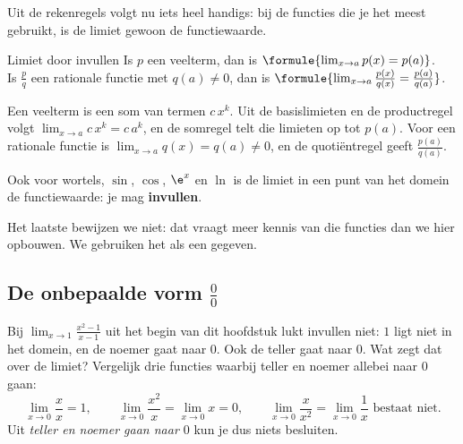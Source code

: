 Uit de rekenregels volgt nu iets heel handigs: bij de functies die je het meest gebruikt, is de limiet gewoon de functiewaarde.

\begin{theorie}
\begin{stelling}{Limiet door invullen}
Is $p$ een veelterm, dan is \quad $\formule{\lim_{x \to a} p(x) = p(a)}$. \\
Is $\frac{p}{q}$ een rationale functie met $q(a) \neq 0$, dan is \quad $\formule{\lim_{x \to a} \frac{p(x)}{q(x)} = \frac{p(a)}{q(a)}}$.
\end{stelling}
\begin{bewijs}
Een veelterm is een som van termen $c\,x^k$. Uit de basislimieten en de productregel volgt $\lim_{x \to a} c\,x^k = c\,a^k$, en de somregel telt die limieten op tot $p(a)$. Voor een rationale functie is $\lim_{x \to a} q(x) = q(a) \neq 0$, en de quotiëntregel geeft $\frac{p(a)}{q(a)}$.
\end{bewijs}
Ook voor wortels, $\sin$, $\cos$, $\e^x$ en $\ln$ is de limiet in een punt van het domein de functiewaarde: je mag \textbf{\textcolor{accent}{invullen}}.
\end{theorie}

Het laatste bewijzen we niet: dat vraagt meer kennis van die functies dan we hier opbouwen. We gebruiken het als een gegeven.


\begin{oefeningen}
\end{oefeningen}

\subsection{De onbepaalde vorm \texorpdfstring{$\frac00$}{0/0}}

Bij $\lim_{x \to 1} \frac{x^2 - 1}{x - 1}$ uit het begin van dit hoofdstuk lukt invullen niet: $1$ ligt niet in het domein, en de noemer gaat naar $0$. Ook de teller gaat naar $0$. Wat zegt dat over de limiet? Vergelijk drie functies waarbij teller en noemer allebei naar $0$ gaan:
\[\lim_{x \to 0} \frac{x}{x} = 1 , \qquad \lim_{x \to 0} \frac{x^2}{x} = \lim_{x \to 0} x = 0 , \qquad \lim_{x \to 0} \frac{x}{x^2} = \lim_{x \to 0} \frac1x \text{ bestaat niet.}\]
Uit \textit{teller en noemer gaan naar $0$} kun je dus niets besluiten.

